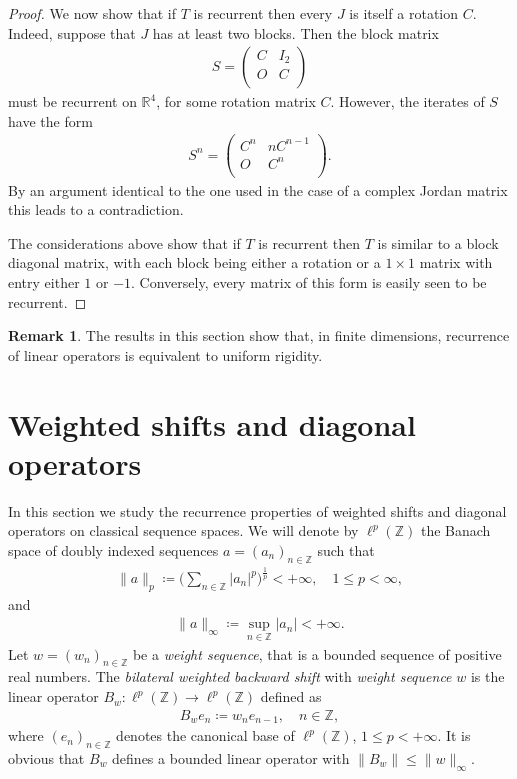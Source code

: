 \documentclass[12pt,leqno]{amsart}
\theoremstyle{plain}
\theoremstyle{definition}
\newtheorem{remark}[equation]{Remark}
\numberwithin{equation}{section}
\begin{document}
\begin{proof}
	We now show that if $T$ is recurrent then every $J$ is itself a rotation $C$. Indeed, suppose that $J$ has at least two blocks. Then the block matrix 
	\begin{align*}
		S = 
		\begin{pmatrix}
			C & I_2 \\
			O & C\\
		\end{pmatrix}
	\end{align*}
	must be recurrent on ${\mathbb R}^4$, for some rotation matrix $C$. However, the iterates of $S$ have the form 
	\begin{align*}
		S^n = 
		\begin{pmatrix}
			C^n & nC^{n-1} \\
			O & C^n\\
		\end{pmatrix}
		. 
	\end{align*}
	By an argument identical to the one used in the case of a complex Jordan matrix this leads to a contradiction.
	
	The considerations above show that if $T$ is recurrent then $T$ is similar to a block diagonal matrix, with each block being either a rotation or a $1\times 1$ matrix with entry either $1$ or $-1$. Conversely, every matrix of this form is easily seen to be recurrent. 
\end{proof}

\begin{remark} The results in this section show that, in finite dimensions, recurrence of linear operators is equivalent to uniform rigidity.
 
\end{remark}

\section{Weighted shifts and diagonal operators}\label{s.weighted} In this section we study the recurrence properties of weighted shifts and diagonal operators on classical sequence spaces. We will denote by $\ell^p(\mathbb Z)$ the Banach space of doubly indexed sequences $a=(a_n)_{n\in\mathbb Z}$ such that 
\begin{align*}
	\|a\|_p\coloneqq \big( \sum_{n\in\mathbb Z} |a_n|^p\big)^\frac{1}{p}<+\infty,\quad 1\leq p <\infty, 
\end{align*}
and 
\begin{align*}
	\|a\|_\infty \coloneqq \sup_{n\in\mathbb Z} |a_n|<+\infty. 
\end{align*}
Let $w=(w_n)_{n\in\mathbb Z}$ be a \emph{weight sequence}, that is a bounded sequence of positive real numbers. The \emph{bilateral weighted backward shift} with \emph{weight sequence} $w$ is the linear operator $B_w:\ell^p(\mathbb Z)\to \ell^p(\mathbb Z)$ defined as 
\begin{align*}
	B_w e_n\coloneqq w_n e_{n-1}, \quad n\in\mathbb Z, 
\end{align*}
where $(e_n)_{n\in\mathbb Z}$ denotes the canonical base of $\ell^p(\mathbb Z)$, $1\leq p <+\infty$. It is obvious that $B_w$ defines a bounded linear operator with $\|B_w\|\leq \|w\|_{\infty}$.
\end{document}
